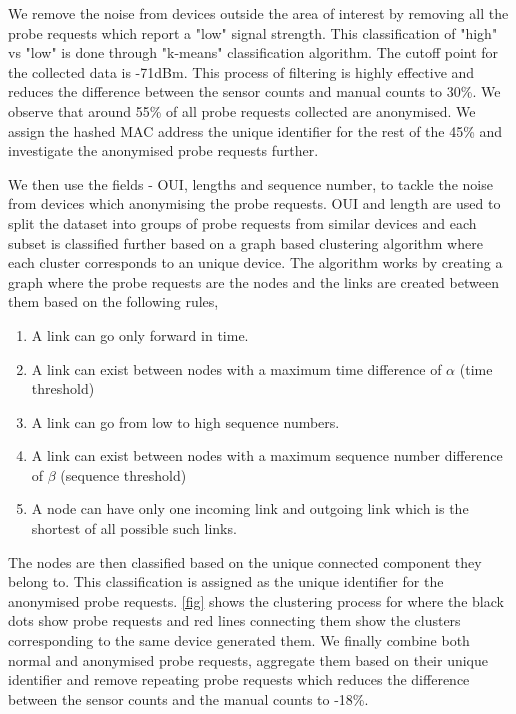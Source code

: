 \documentclass[11t, a4paper, twocolumn]{article}
\begin{document}
	We remove the noise from devices outside the area of interest 
	by removing all the probe requests which report a "low" signal strength.
	This classification of "high" vs "low" is done through "k-means"
	classification algorithm.
	The cutoff point for the collected data is -71dBm.
	This process of filtering is highly effective and reduces the difference
	between the sensor counts and manual counts to 30\%. We observe that
	around 55\% of all probe requests collected are anonymised.
	We assign the hashed MAC address the unique identifier for the rest of
	the 45\% and investigate the anonymised probe requests further.
	
	We then use the fields - OUI, lengths and sequence number,
	to tackle the noise from devices which anonymising the probe requests.
	OUI and length are used to split the dataset into
	groups of probe requests from similar
	devices and each subset is classified further
	based on a graph based clustering algorithm 
	where each cluster corresponds to an unique device.
	The algorithm works by creating a graph where the probe requests
	are the nodes and the links are created
	between them based on the following rules,

	\begin{enumerate}
		\item A link can go only forward in time.
		\item A link can exist between nodes with a 
			maximum time difference of $\alpha$ (time threshold)
		\item A link can go from low to high sequence numbers.
		\item A link can exist between nodes with a
			maximum sequence number difference of $\beta$ (sequence threshold)
		\item A node can have only one incoming link and outgoing link
			which is the shortest of all possible such links.
	\end{enumerate}

	The nodes are then classified based on the unique connected component they
	belong to. This classification is assigned as the unique identifier for the
	anonymised probe requests.
	\ref{fig} shows the clustering process for where the black dots show
	probe requests and red lines connecting them show the clusters
	corresponding to the same device generated them.
	We finally combine both normal and anonymised probe requests, 
	aggregate them based on their unique identifier and remove
	repeating probe requests which reduces the difference between
	the sensor counts and the manual counts to -18\%.
\end{document}
